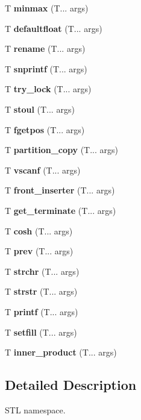\begin{DoxyCompactItemize}
\item 
T \textbf{ minmax} (T... args)
\item 
T \textbf{ defaultfloat} (T... args)
\item 
T \textbf{ rename} (T... args)
\item 
T \textbf{ snprintf} (T... args)
\item 
T \textbf{ try\+\_\+lock} (T... args)
\item 
T \textbf{ stoul} (T... args)
\item 
T \textbf{ fgetpos} (T... args)
\item 
T \textbf{ partition\+\_\+copy} (T... args)
\item 
T \textbf{ vscanf} (T... args)
\item 
T \textbf{ front\+\_\+inserter} (T... args)
\item 
T \textbf{ get\+\_\+terminate} (T... args)
\item 
T \textbf{ cosh} (T... args)
\item 
T \textbf{ prev} (T... args)
\item 
T \textbf{ strchr} (T... args)
\item 
T \textbf{ strstr} (T... args)
\item 
T \textbf{ printf} (T... args)
\item 
T \textbf{ setfill} (T... args)
\item 
T \textbf{ inner\+\_\+product} (T... args)
\end{DoxyCompactItemize}


\subsection{Detailed Description}
S\+TL namespace. 